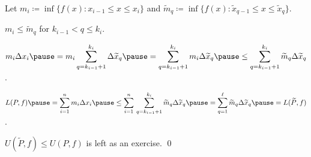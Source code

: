 \documentclass[10pt,aspectratio=149]{beamer}
\begin{document}
\begin{frame}


\pause
\medskip

Let
$m_i \coloneqq \inf \bigl\{ f(x) : x_{i-1} \leq x \leq x_i \bigr\}$
and
$\widetilde{m}_q \coloneqq \inf \bigl\{ f(x) : \widetilde{x}_{q-1} \leq x \leq
\widetilde{x}_q \bigr\}$.

\pause
\medskip

$m_i \leq \widetilde{m}_q$ for $k_{i-1} < q \leq k_i$.

\pause
\medskip

\thus\quad
$\displaystyle
m_i \Delta x_i
\pause
=
m_i \sum_{q=k_{i-1}+1}^{k_i} \Delta \widetilde{x}_q
\pause
=
\sum_{q=k_{i-1}+1}^{k_i} m_i \Delta \widetilde{x}_q
\pause
\leq
\sum_{q=k_{i-1}+1}^{k_i} \widetilde{m}_q \Delta \widetilde{x}_q$.

\pause
\medskip

\thus\quad
$\displaystyle
L(P,f)
\pause
=
\sum_{i=1}^n m_i \Delta x_i
\pause
\leq
\sum_{i=1}^n \,
\sum_{q=k_{i-1}+1}^{k_i} \widetilde{m}_q \Delta \widetilde{x}_q
\pause
=
\sum_{q=1}^{\ell}
\widetilde{m}_q \Delta \widetilde{x}_q
\pause
= L(\widetilde{P},f)$.

\pause
\medskip

$U(\widetilde{P},f) \leq U(P,f)$ is left as an exercise.
\qed

\end{frame}
\end{document}
